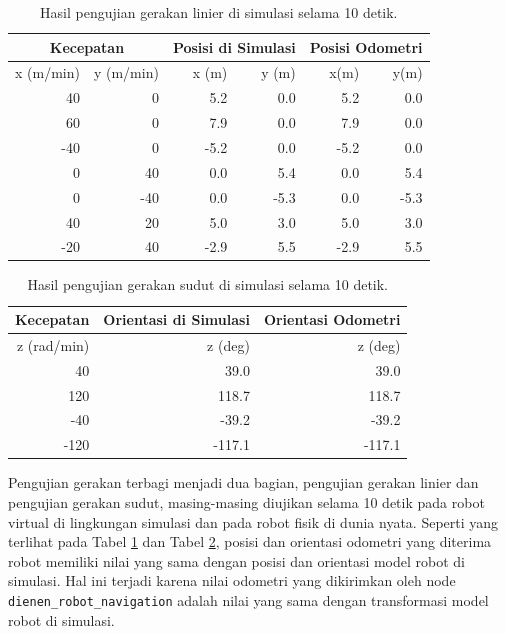 \begin{table}
  \caption{Hasil pengujian gerakan linier di simulasi selama 10 detik.}
  \label{tab:hasilujiliniersimulasi}
  \centering
  \begin{tabular}{rr|rr|rr}
    \toprule
    \multicolumn{2}{c|}{Kecepatan} &
    \multicolumn{2}{|c|}{Posisi di Simulasi} &
    \multicolumn{2}{|c}{Posisi Odometri} \\
    \midrule
    x (m/min) & y (m/min) & x (m) & y (m) & x(m)  & y(m) \\
    \midrule
    40        & 0         & 5.2   & 0.0   & 5.2   & 0.0 \\
    60        & 0         & 7.9   & 0.0   & 7.9   & 0.0 \\
    -40       & 0         & -5.2  & 0.0   & -5.2  & 0.0 \\
    0         & 40        & 0.0   & 5.4   & 0.0   & 5.4 \\
    0         & -40       & 0.0   & -5.3  & 0.0   & -5.3 \\
    40        & 20        & 5.0   & 3.0   & 5.0   & 3.0 \\
    -20       & 40        & -2.9  & 5.5   & -2.9  & 5.5 \\
    \bottomrule
  \end{tabular}
\end{table}

\begin{table}
  \caption{Hasil pengujian gerakan sudut di simulasi selama 10 detik.}
  \label{tab:hasilujisudutsimulasi}
  \centering
  \begin{tabular}{r|r|r}
    \toprule
    Kecepatan   & Orientasi di Simulasi & Orientasi Odometri \\
    \midrule
    z (rad/min) & z (deg)               & z (deg) \\
    \midrule
    40          & 39.0                  & 39.0 \\
    120         & 118.7                 & 118.7 \\
    -40         & -39.2                 & -39.2 \\
    -120        & -117.1                & -117.1 \\
    \bottomrule
  \end{tabular}
\end{table}

Pengujian gerakan terbagi menjadi dua bagian, pengujian gerakan linier dan pengujian gerakan sudut, masing-masing diujikan selama 10 detik pada robot virtual di lingkungan simulasi dan pada robot fisik di dunia nyata.
Seperti yang terlihat pada Tabel \ref{tab:hasilujiliniersimulasi} dan Tabel \ref{tab:hasilujisudutsimulasi}, posisi dan orientasi odometri yang diterima robot memiliki nilai yang sama dengan posisi dan orientasi model robot di simulasi.
Hal ini terjadi karena nilai odometri yang dikirimkan oleh node \lstinline{dienen_robot_navigation} adalah nilai yang sama dengan transformasi model robot di simulasi.

